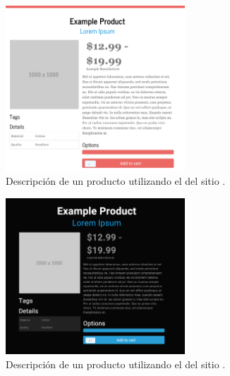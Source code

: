 \begin{figure}[H]
	\centering
	\includegraphics[width=0.6\textwidth]{figuras/bootstrap/bootstrap_theme_journal.png}

	\caption{Descripción de un producto utilizando el \themeCPT \textbf{\themeJournal} del sitio \bootswatchNAME.}
	\label{figure:bootstrap:theme_journal}
\end{figure}

\begin{figure}[H]
	\centering
	\includegraphics[width=0.6\textwidth]{figuras/bootstrap/bootstrap_theme_cyborg.png}

	\caption{Descripción de un producto utilizando el \themeCPT \textbf{\themeCyborg} del sitio \bootswatchNAME.}
	\label{figure:bootstrap:theme_cyborg}
\end{figure}


